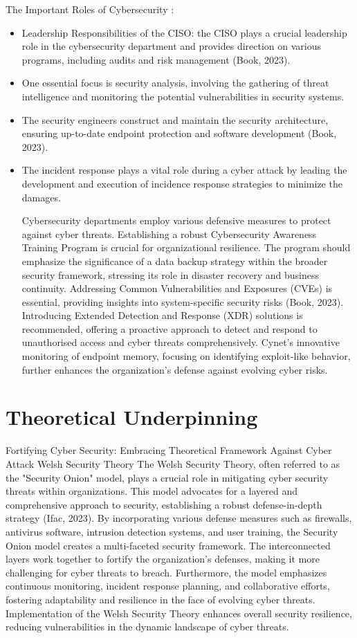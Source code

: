 The Important Roles of Cybersecurity :
\begin{itemize}

	\item Leadership Responsibilities of the CISO: the CISO plays a crucial leadership role in the cybersecurity department and provides direction on various programs, including audits and risk management (Book, 2023).
	\item One essential focus is security analysis, involving the gathering of threat intelligence and monitoring the potential vulnerabilities in security systems.
	\item The security engineers construct and maintain the security architecture, ensuring up-to-date endpoint protection and software development (Book, 2023). 
	\item The incident response plays a vital role during a cyber attack by leading the development and execution of incidence response strategies to minimize the damages. 

Cybersecurity departments employ various defensive measures to protect against cyber threats.
Establishing a robust Cybersecurity Awareness Training Program is crucial for organizational resilience. The program should emphasize the significance of a data backup strategy within the broader security framework, stressing its role in disaster recovery and business continuity. Addressing Common Vulnerabilities and Exposures (CVEs) is essential, providing insights into system-specific security risks (Book, 2023). Introducing Extended Detection and Response (XDR) solutions is recommended, offering a proactive approach to detect and respond to unauthorised access and cyber threats comprehensively. Cynet's innovative monitoring of endpoint memory, focusing on identifying exploit-like behavior, further enhances the organization's defense against evolving cyber risks.
\end{itemize}

\section{Theoretical Underpinning}
\label{sec:into_back}

Fortifying Cyber Security: Embracing Theoretical Framework Against Cyber Attack
Welsh Security Theory
The Welsh Security Theory, often referred to as the "Security Onion" model, plays a crucial role in mitigating cyber security threats within organizations. This model advocates for a layered and comprehensive approach to security, establishing a robust defense-in-depth strategy (Ifac, 2023). By incorporating various defense measures such as firewalls, antivirus software, intrusion detection systems, and user training, the Security Onion model creates a multi-faceted security framework. The interconnected layers work together to fortify the organization's defenses, making it more challenging for cyber threats to breach. Furthermore, the model emphasizes continuous monitoring, incident response planning, and collaborative efforts, fostering adaptability and resilience in the face of evolving cyber threats. Implementation of the Welsh Security Theory enhances overall security resilience, reducing vulnerabilities in the dynamic landscape of cyber threats.

